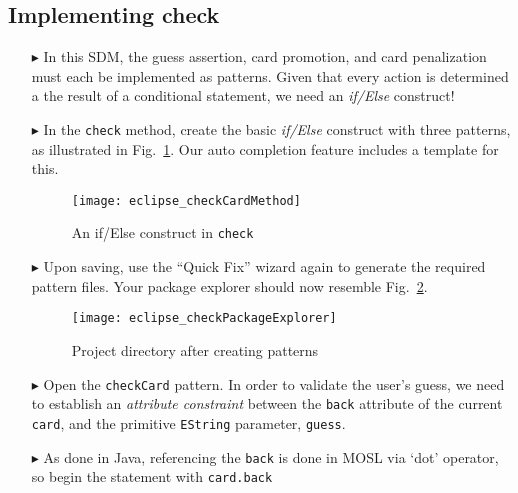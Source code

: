 \newpage
\hypertarget{checkCard tex}{}
\subsection{Implementing check}
\texHeader
 
\begin{itemize}
   
\item[$\blacktriangleright$] In this SDM, the guess assertion, card promotion, and card penalization must each be implemented as patterns. Given that every
action is determined a the result of a conditional statement, we need an \emph{if/Else} construct!

\item[$\blacktriangleright$] In the \texttt{check} method, create the basic \emph{if/Else} construct with three patterns, as illustrated in
Fig.~\ref{fig:checkDec}. Our auto completion feature includes a template for this.

\vspace{0.5cm}

\begin{figure}[htbp]
\begin{center}
  \texttt{[image: eclipse\_checkCardMethod]}
  \caption{An if/Else construct in \texttt{check}}
  \label{fig:checkDec}
\end{center}
\end{figure} 

\item[$\blacktriangleright$] Upon saving, use the ``Quick Fix'' wizard again to generate the required pattern files. Your package explorer should now resemble
Fig.~\ref{fig:checkPatternsExplorer}.

\begin{figure}[htbp]
\begin{center}
  \texttt{[image: eclipse\_checkPackageExplorer]}
  \caption{Project directory after creating patterns}
  \label{fig:checkPatternsExplorer}
\end{center}
\end{figure} 

\item[$\blacktriangleright$] Open the \texttt{checkCard} pattern. In order to validate the user's guess, we need to establish an \emph{attribute constraint}
between the \texttt{back} attribute of the current \texttt{card}, and the primitive \texttt{EString} parameter, \texttt{guess}. 

\item[$\blacktriangleright$] As done in Java, referencing the \texttt{back} is done in MOSL via `dot' operator, so begin the statement with \texttt{card.back}


\end{itemize}
